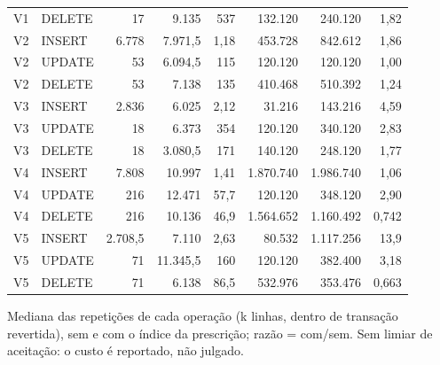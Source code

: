 {\begin{tabular}{llrrrrrr}
V1 & DELETE & 17 & 9.135 & 537 & 132.120 & 240.120 & 1,82 \\
V2 & INSERT & 6.778 & 7.971,5 & 1,18 & 453.728 & 842.612 & 1,86 \\
V2 & UPDATE & 53 & 6.094,5 & 115 & 120.120 & 120.120 & 1,00 \\
V2 & DELETE & 53 & 7.138 & 135 & 410.468 & 510.392 & 1,24 \\
V3 & INSERT & 2.836 & 6.025 & 2,12 & 31.216 & 143.216 & 4,59 \\
V3 & UPDATE & 18 & 6.373 & 354 & 120.120 & 340.120 & 2,83 \\
V3 & DELETE & 18 & 3.080,5 & 171 & 140.120 & 248.120 & 1,77 \\
V4 & INSERT & 7.808 & 10.997 & 1,41 & 1.870.740 & 1.986.740 & 1,06 \\
V4 & UPDATE & 216 & 12.471 & 57,7 & 120.120 & 348.120 & 2,90 \\
V4 & DELETE & 216 & 10.136 & 46,9 & 1.564.652 & 1.160.492 & 0,742 \\
V5 & INSERT & 2.708,5 & 7.110 & 2,63 & 80.532 & 1.117.256 & 13,9 \\
V5 & UPDATE & 71 & 11.345,5 & 160 & 120.120 & 382.400 & 3,18 \\
V5 & DELETE & 71 & 6.138 & 86,5 & 532.976 & 353.476 & 0,663 \\
\bottomrule
\end{tabular}\par
\vspace{3pt}
\begin{minipage}{\linewidth}\footnotesize
Mediana das repetições de cada operação (k linhas, dentro de transação revertida), sem e com o índice da prescrição; razão = com/sem. Sem limiar de aceitação: o custo é reportado, não julgado.
\end{minipage}
}
